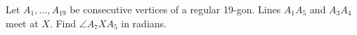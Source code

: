 Let $A_1,\ldots,A_{19}$ be consecutive vertices of a regular 19-gon. Lines $A_1A_5$ and $A_3A_4$ meet at $X$. Find $\angle A_7XA_5$ in radians.

